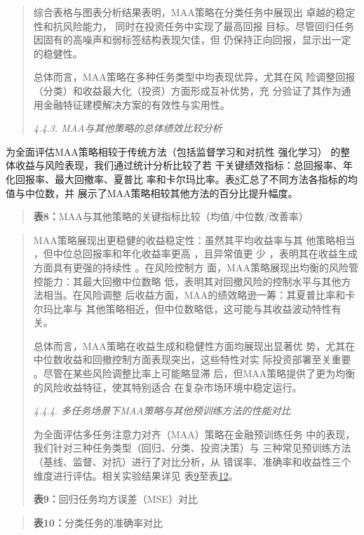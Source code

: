 \begin{quote}
综合表格与图表分析结果表明，MAA策略在分类任务中展现出
卓越的稳定性和抗风险能力， 同时在投资任务中实现了最高回报
目标。尽管回归任务因固有的高噪声和弱标签结构表现欠佳，但
仍保持正向回报，显示出一定的稳健性。

总体而言，MAA策略在多种任务类型中均表现优异，尤其在风
险调整回报（分类）和收益最大化（投资）方面形成互补优势，充
分验证了其作为通用金融特征建模解决方案的有效性与实用性。

\protect{}\label{bookmark60}{}\emph{4.4.3.
MAA与其他策略的总体绩效比较分析}
\end{quote}

为全面评估MAA策略相较于传统方法（包括监督学习和对抗性 强化学习）
的整体收益与风险表现，我们通过统计分析比较了若
干关键绩效指标：总回报率、年化回报率、最大回撤率、夏普比
率和卡尔玛比率。表\hyperref[bookmark60]{8}汇总了不同方法各指标的均值与中位数，并
展示了MAA策略相较其他方法的百分比提升幅度。

\begin{quote}
\textbf{表8：}MAA与其他策略的关键指标比较（均值/中位数/改善率）
\end{quote}

\begin{quote}
MAA策略展现出更稳健的收益稳定性：虽然其平均收益率与其 他策略相当
，但中位总回报率和年化收益率更高 ，且异常值更 少
，表明其在收益生成方面具有更强的持续性 。在风险控制方
面，MAA策略展现出均衡的风险管控能力：其最大回撤中位数略
低，表明其对回撤风险的控制水平与其他方法相当。在风险调整
后收益方面，MAA的绩效略逊一筹：其夏普比率和卡尔玛比率与
其他策略相近，但中位数略低，这可能与其收益波动特性有关。

总体而言，MAA策略在收益生成和稳健性方面均展现出显著优
势，尤其在中位数收益和回撤控制方面表现突出，这些特性对实
际投资部署至关重要 。尽管在某些风险调整比率上可能略显滞
后，但MAA策略提供了更为均衡的风险收益特征，使其特别适合
在复杂市场环境中稳定运行。

\emph{4.4.4. 多任务场景下MAA策略与其他预训练方法的性能对比}

为全面评估多任务注意力对齐（MAA）策略在金融预训练任务
中的表现，我们针对三种任务类型（回归、分类、投资决策）与
三种常见预训练方法（基线、监督、对抗）进行了对比分析，从
错误率、准确率和收益性三个维度进行评估。相关实验结果详见
表\hyperref[bookmark61]{9}至表\hyperref[bookmark62]{12}。

\textbf{表9：}回归任务均方误差（MSE）对比
\end{quote}


\begin{quote}
\textbf{表10：}分类任务的准确率对比
\end{quote}

